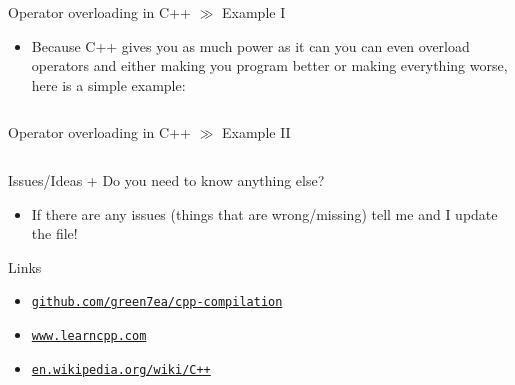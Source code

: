 \documentclass[10pt]{beamer}
\newcommand{\urlCustom}[1]{\href{https://#1}{\textcolor{greyCustom}{\texttt{#1}}}}
\begin{document}
\begin{frame}{Operator overloading in C++ $\gg$ Example I}
\begin{itemize}
	\item Because C++ gives you as much power as it can you can even overload operators and either making you program better or making everything worse, here is a simple example:
	\inputminted[bgcolor=lightGreyCustom,fontsize=\scriptsize,lastline=18]{cpp}{./resources/operator_overloading.cpp}
\end{itemize}
\end{frame}

\begin{frame}{Operator overloading in C++ $\gg$ Example II}
\begin{itemize}
	\inputminted[bgcolor=lightGreyCustom,fontsize=\scriptsize,firstline=19]{cpp}{./resources/operator_overloading.cpp}
\end{itemize}
\end{frame}

\begin{frame}{Issues/Ideas + Do you need to know anything else?}
	\begin{itemize}
		\item If there are any issues (things that are wrong/missing) tell me and I update the file!
	\end{itemize}
\end{frame}

\begin{frame}{Links}
	\begin{itemize}
		\item\urlCustom{github.com/green7ea/cpp-compilation}
		\item\urlCustom{www.learncpp.com}
		\item\urlCustom{en.wikipedia.org/wiki/C++}
		
	\end{itemize}
	\begin{center}\doclicenseThis\end{center}
\end{frame}
\end{document}

